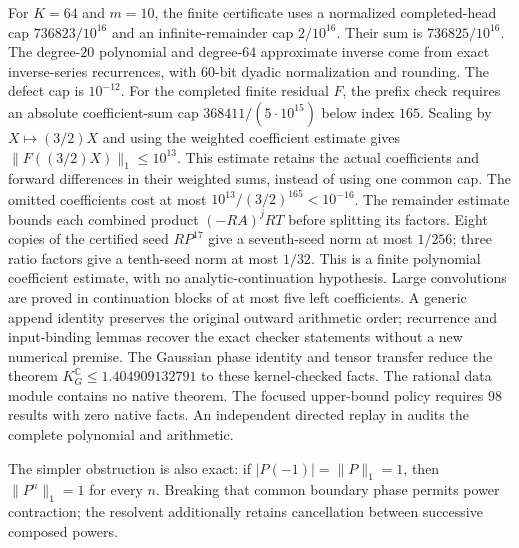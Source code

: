 \documentclass[11pt,a4paper]{article}
\newcommand{\C}{\mathbb{C}}
\newcommand{\KG}{K_G^{\C}}
\begin{document}
For $K=64$ and $m=10$, the finite certificate uses a normalized completed-head cap
$736823/10^{16}$ and an infinite-remainder cap $2/10^{16}$.
Their sum is $736825/10^{16}$.
The degree-$20$ polynomial and degree-$64$ approximate inverse come from exact inverse-series
recurrences, with $60$-bit dyadic normalization and rounding. The defect cap is $10^{-12}$.
For the completed finite residual $F$, the prefix check requires an absolute
coefficient-sum cap $368411/(5\cdot10^{15})$ below index $165$. Scaling by
$X\mapsto(3/2)X$ and using the weighted coefficient estimate gives
$\|F((3/2)X)\|_1\le10^{13}$.
This estimate retains the actual coefficients and forward differences in their
weighted sums, instead of using one common cap.
The omitted coefficients cost at most $10^{13}/(3/2)^{165}<10^{-16}$.
The remainder estimate bounds each combined product $(-RA)^jRT$ before splitting
its factors. Eight copies of the certified seed $RP^{17}$ give a seventh-seed norm
at most $1/256$; three ratio factors give a tenth-seed norm at most $1/32$.
This is a finite polynomial coefficient estimate, with no analytic-continuation
hypothesis. Large convolutions are proved in continuation blocks of at most five
left coefficients. A generic append identity preserves the original outward arithmetic
order; recurrence and input-binding lemmas recover the exact checker statements
without a new numerical premise. The Gaussian phase identity and tensor transfer reduce
the theorem $\KG\le1.404909132791$ to these kernel-checked facts. The rational data module contains no native theorem.
The focused upper-bound policy requires 98 results with zero native facts.
An independent directed replay in 
audits the complete polynomial and arithmetic.

The simpler obstruction is also exact: if $|P(-1)|=\|P\|_1=1$, then
$\|P^n\|_1=1$ for every $n$. Breaking that common boundary phase permits
power contraction; the resolvent additionally retains cancellation
between successive composed powers.
\end{document}
